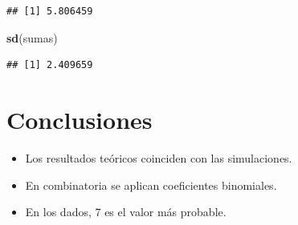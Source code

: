 \documentclass[
]{article}
\newenvironment{Shaded}{\begin{snugshade}}{\end{snugshade}}
\newcommand{\FunctionTok}[1]{\textcolor[rgb]{0.13,0.29,0.53}{\textbf{#1}}}
\newcommand{\NormalTok}[1]{#1}
\providecommand{\tightlist}{%
  \setlength{\itemsep}{0pt}\setlength{\parskip}{0pt}}
\begin{document}
\begin{verbatim}
## [1] 5.806459
\end{verbatim}

\begin{Shaded}
\begin{Highlighting}[]
\FunctionTok{sd}\NormalTok{(sumas)}
\end{Highlighting}
\end{Shaded}

\begin{verbatim}
## [1] 2.409659
\end{verbatim}

\section{Conclusiones}\label{conclusiones}

\begin{itemize}
\tightlist
\item
  Los resultados teóricos coinciden con las simulaciones.
\item
  En combinatoria se aplican coeficientes binomiales.
\item
  En los dados, 7 es el valor más probable.
\end{itemize}
\end{document}
